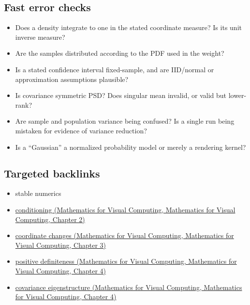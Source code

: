 \subsection{Fast error checks}\label{appendix-cb5af353ef77-fast-error-checks}

\begin{itemize}
\tightlist
\item
  Does a density integrate to one in the stated coordinate measure? Is its unit inverse measure?
\item
  Are the samples distributed according to the PDF used in the weight?
\item
  Is a stated confidence interval fixed-sample, and are IID/normal or approximation assumptions plausible?
\item
  Is covariance symmetric PSD? Does singular mean invalid, or valid but lower-rank?
\item
  Are sample and population variance being confused? Is a single run being mistaken for evidence of variance reduction?
\item
  Is a ``Gaussian'' a normalized probability model or merely a rendering kernel?
\end{itemize}

\subsection{Targeted backlinks}\label{appendix-cb5af353ef77-targeted-backlinks}

\begin{itemize}
\tightlist
\item
  {stable numerics}
\item
  \href{../02-Mathematics-for-Visual-Computing/main.pdf\#nameddest=01-foundations-i-ch018-an-inverse-can-exist-and-still-amplify-uncertainty}{conditioning (Mathematics for Visual Computing, Mathematics for Visual Computing, Chapter 2)}
\item
  \href{../02-Mathematics-for-Visual-Computing/main.pdf\#nameddest=01-foundations-i-ch019-coordinates-can-change-while-the-geometric-object-stays-still}{coordinate changes (Mathematics for Visual Computing, Mathematics for Visual Computing, Chapter 3)}
\item
  \href{../02-Mathematics-for-Visual-Computing/main.pdf\#nameddest=01-foundations-i-ch020-positive-definiteness-is-a-structural-promise}{positive definiteness (Mathematics for Visual Computing, Mathematics for Visual Computing, Chapter 4)}
\item
  \href{../02-Mathematics-for-Visual-Computing/main.pdf\#nameddest=01-foundations-i-ch020-diagonalization-leads-to-the-stronger-symmetric-spectral-theorem}{covariance eigenstructure (Mathematics for Visual Computing, Mathematics for Visual Computing, Chapter 4)}
\end{itemize}

